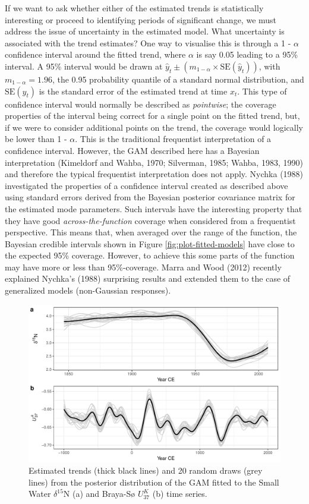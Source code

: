 \documentclass[12pt,]{article}
\newcommand{\uk}{\ensuremath{\mathit{U}^{\mathit{K}}_{\mathup{37}}}}
\begin{document}
If we want to ask whether either of the estimated trends is
statistically interesting or proceed to identifying periods of
significant change, we must address the issue of uncertainty in the
estimated model. What uncertainty is associated with the trend
estimates? One way to visualise this is through a 1 - \(\alpha\)
confidence interval around the fitted trend, where \(\alpha\) is say
0.05 leading to a 95\% interval. A 95\% interval would be drawn at
\(\hat{y}_t \pm (m_{1-\alpha} \times \text{SE}(\hat{y}_t))\), with
\(m_{1-\alpha} = 1.96\), the 0.95 probability quantile of a standard
normal distribution, and \(\text{SE}(\hat{y}_t)\) is the standard error
of the estimated trend at time \(x_t\). This type of confidence interval
would normally be described as \emph{pointwise}; the coverage properties
of the interval being correct for a single point on the fitted trend,
but, if we were to consider additional points on the trend, the coverage
would logically be lower than 1 - \(\alpha\). This is the traditional
frequentist interpretation of a confidence interval. However, the GAM
described here has a Bayesian interpretation (Kimeldorf and Wahba, 1970;
Silverman, 1985; Wahba, 1983, 1990) and therefore the typical
frequentist interpretation does not apply. Nychka (1988) investigated
the properties of a confidence interval created as described above using
standard errors derived from the Bayesian posterior covariance matrix
for the estimated mode parameters. Such intervals have the interesting
property that they have good \emph{across-the-function} coverage when
considered from a frequentist perspective. This means that, when
averaged over the range of the function, the Bayesian credible intervals
shown in Figure \ref{fig:plot-fitted-models} have close to the expected
95\% coverage. However, to achieve this some parts of the function may
have more or less than 95\%-coverage. Marra and Wood (2012) recently
explained Nychka's (1988) surprising results and extended them to the
case of generalized models (non-Gaussian responses).

\begin{figure}

{\centering \includegraphics[width=0.8\linewidth]{manuscript_files/figure-latex/posterior-simulation-1} 

}

\caption{Estimated trends (thick black lines) and 20 random draws (grey lines) from the posterior distribution of the GAM fitted to the Small Water $\delta^{15}\text{N}$ (a) and Braya-Sø \uk{} (b) time series.}\label{fig:posterior-simulation}
\end{figure}
\end{document}
